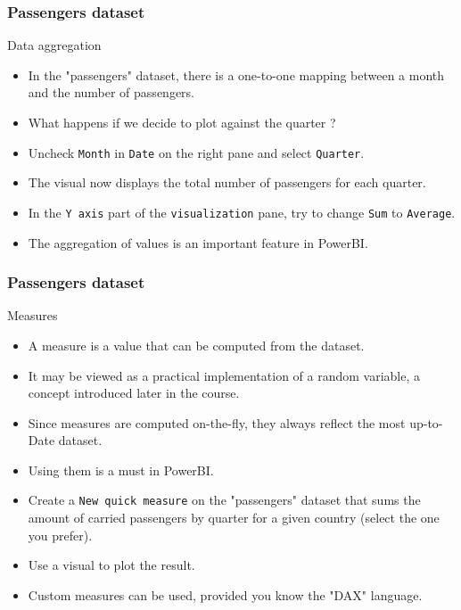 \begin{frame}
    \frametitle{Passengers dataset}
\begin{block}{Data aggregation}
    \begin{itemize}
        \item<+-> In the "passengers" dataset, there is a one-to-one mapping
        between a month and the number of passengers. 
        \item<+-> What happens if we decide to plot against the quarter ?
        \item<+-> Uncheck \texttt{Month} in \texttt{Date} on the right pane and
        select \texttt{Quarter}.
        \item<+-> The visual now displays the total number of passengers for each quarter.
        \item<+-> In the \texttt{Y axis} part of the \texttt{visualization} pane,
        try to change \texttt{Sum} to \texttt{Average}.
        \item<+-> The aggregation of values is an important feature in PowerBI.
    \end{itemize}
\end{block}
\end{frame}
\begin{frame}
    \frametitle{Passengers dataset}
\begin{block}{Measures}
    \begin{itemize}
        \item<+-> A measure is a value that can be computed from the dataset.
        \item<+-> It may be viewed as a practical implementation of a random variable,
        a concept introduced later in the course.
        \item<+-> Since measures are computed on-the-fly, they always reflect the most up-to-Date dataset.
        \item<+-> Using them is a must in PowerBI.
        \item<+-> Create a \texttt{New quick measure} on the "passengers" dataset that sums the amount of 
        carried passengers by quarter for a given country (select the one you prefer).
        \item<+-> Use a visual to plot the result.
        \item<+-> Custom measures can be used, provided you know the "DAX" language.
    \end{itemize}
\end{block}
\end{frame}
